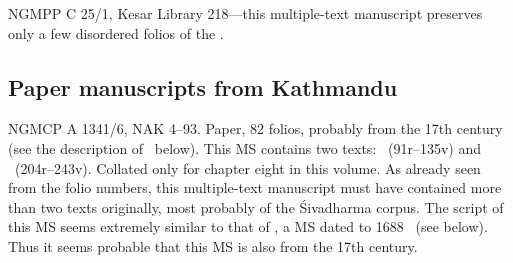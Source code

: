 NGMPP C 25/1, Kesar Library 218---this multiple-text manuscript
preserves only a few disordered folios of the \VSS.

\bigskip

\subsection{Paper manuscripts from Kathmandu}

NGMCP A 1341/6, NAK 4--93. Paper, 82 folios,
probably from the 17th century (see the
description of \msPaperC\ below). 
This MS contains two texts: 
\SDhSangr\ (\fols91r--135v) and 
\Vss\ (\fols204r--243v). Collated only for
chapter eight in this volume. As already seen
from the folio numbers, this multiple-text
manuscript must have contained more than two
texts originally, most probably of the
Śivadharma corpus. 
The script of this MS seems extremely similar to that 
of \msPaperC, a MS dated to 1688 \CE\ (see below).
Thus it seems probable that this MS is also
from the 17th century.

